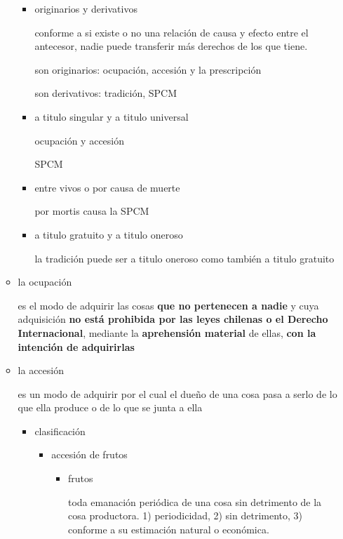 \documentclass[]{article}
\providecommand{\tightlist}{%
  \setlength{\itemsep}{0pt}\setlength{\parskip}{0pt}}
\begin{document}
\begin{itemize}
\begin{itemize}
    \begin{itemize}
    \item
      originarios y derivativos

      conforme a si existe o no una relación de causa y efecto entre el
      antecesor, nadie puede transferir más derechos de los que tiene.

      son originarios: ocupación, accesión y la prescripción

      son derivativos: tradición, SPCM
    \item
      a titulo singular y a titulo universal

      ocupación y accesión

      SPCM
    \item
      entre vivos o por causa de muerte

      por mortis causa la SPCM
    \item
      a titulo gratuito y a titulo oneroso

      la tradición puede ser a titulo oneroso como también a titulo
      gratuito
    \end{itemize}
  \item
    la ocupación

    es el modo de adquirir las cosas \textbf{que no pertenecen a nadie}
    y cuya adquisición \textbf{no está prohibida por las leyes chilenas
    o el Derecho Internacional}, mediante la \textbf{aprehensión
    material} de ellas, \textbf{con la intención de adquirirlas}
  \item
    la accesión

    es un modo de adquirir por el cual el dueño de una cosa pasa a serlo
    de lo que ella produce o de lo que se junta a ella

    \begin{itemize}
    \tightlist
    \item
      clasificación

      \begin{itemize}
      \tightlist
      \item
        accesión de frutos

        \begin{itemize}
        \item
          frutos

          toda emanación periódica de una cosa sin detrimento de la cosa
          productora. 1) periodicidad, 2) sin detrimento, 3) conforme a
          su estimación natural o económica.


\end{itemize}
\end{itemize}
\end{itemize}
\end{itemize}
\end{itemize}
\end{document}
